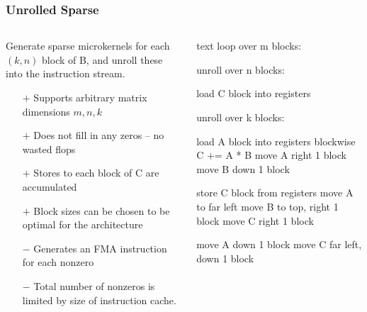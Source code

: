 \documentclass[9pt]{beamer}
\begin{document}
\begin{frame}[fragile]
  \frametitle{Unrolled Sparse}
  \begin{columns}[t]%
    \begin{column}{0.5\textwidth}
      Generate sparse microkernels for each $(k,n)$ block of B, and unroll these into the instruction stream.
      \begin{itemize}
      \item[$+$] Supports arbitrary matrix dimensions $m,n,k$
      \item[$+$] Does not fill in any zeros -- no wasted flops
      \item[$+$] Stores to each block of C are accumulated
      \item[$+$] Block sizes can be chosen to be optimal for the architecture

      \item[$-$] Generates an FMA instruction for each nonzero
      \item[$-$] Total number of nonzeros is limited by size of instruction cache.

      \end{itemize}
    \end{column}
    \begin{column}{0.5\textwidth}
      \begin{ccode}[]
        {text}
        loop over m blocks:

           unroll over n blocks:

              load C block into registers

              unroll over k blocks:

                 load A block into registers
                 blockwise C += A * B
                 move A right 1 block
                 move B down 1 block

              store C block from registers
              move A to far left
              move B to top, right 1 block
              move C right 1 block

           move A down 1 block
           move C far left, down 1 block
      \end{ccode}
    \end{column}
  \end{columns}
\end{frame}
\end{document}
